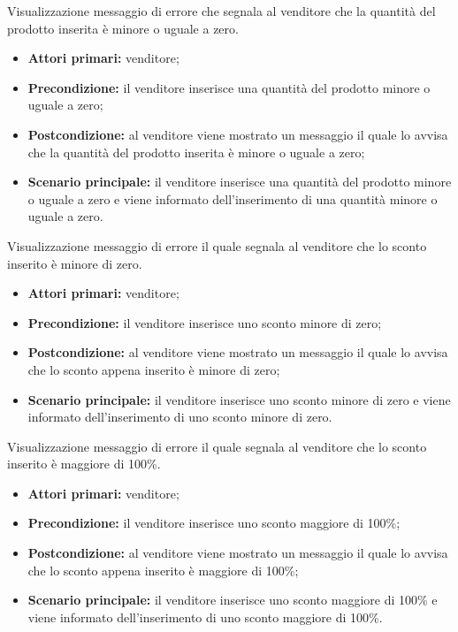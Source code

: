 Visualizzazione messaggio di errore che segnala al venditore che la quantità del prodotto inserita è minore o uguale a zero.
\begin{itemize}
    \item \textbf{Attori primari:} venditore;
    \item \textbf{Precondizione:} il venditore inserisce una quantità del prodotto minore o uguale a zero;
    \item \textbf{Postcondizione:} al venditore viene mostrato un messaggio il quale lo avvisa che la quantità del prodotto inserita è minore o uguale a zero;
    \item \textbf{Scenario principale:} il venditore inserisce una quantità del prodotto minore o uguale a zero e viene informato dell'inserimento di una quantità minore o uguale a zero.
\end{itemize}

Visualizzazione messaggio di errore il quale segnala al venditore che lo sconto inserito è minore di zero.
\begin{itemize}
    \item \textbf{Attori primari:} venditore;
    \item \textbf{Precondizione:} il venditore inserisce uno sconto minore di zero;
    \item \textbf{Postcondizione:} al venditore viene mostrato un messaggio il quale lo avvisa che lo sconto appena inserito è minore di zero;
    \item \textbf{Scenario principale:} il venditore inserisce uno sconto minore di zero e viene informato dell'inserimento di uno sconto minore di zero.
\end{itemize}

Visualizzazione messaggio di errore il quale segnala al venditore che lo sconto inserito è maggiore di 100\%.
\begin{itemize}
    \item \textbf{Attori primari:} venditore;
    \item \textbf{Precondizione:} il venditore inserisce uno sconto maggiore di 100\%;
    \item \textbf{Postcondizione:} al venditore viene mostrato un messaggio il quale lo avvisa che lo sconto appena inserito è maggiore di 100\%;
    \item \textbf{Scenario principale:} il venditore inserisce uno sconto maggiore di 100\% e viene informato dell'inserimento di uno sconto maggiore di 100\%.
\end{itemize}

